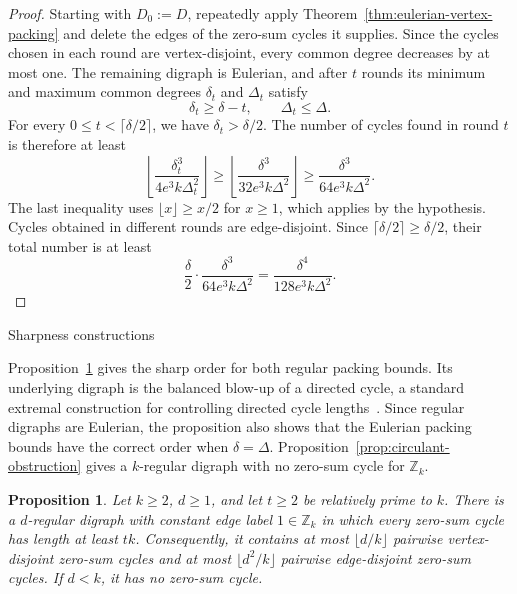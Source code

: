 \documentclass[11pt]{amsart}
\makeatletter
\def\section{\@startsection{section}{1}%
  \z@{1.5\linespacing\@plus.6\linespacing}{.65\linespacing}%
  {\normalfont\Large\bfseries\raggedright}}
\newtheorem{proposition}[theorem]{Proposition}
\theoremstyle{remark}
\makeatother
\begin{document}
\begin{proof}
Starting with $D_0:=D$, repeatedly apply
Theorem~\ref{thm:eulerian-vertex-packing} and delete the edges of the
zero-sum cycles it supplies.  Since the cycles chosen in each round are
vertex-disjoint, every common degree decreases by at most one.  The
remaining digraph is Eulerian, and after $t$ rounds its minimum and
maximum common degrees $\delta_t$ and $\Delta_t$ satisfy
\[
  \delta_t\ge\delta-t,
  \qquad
  \Delta_t\le\Delta.
\]
For every $0\le t<\lceil\delta/2\rceil$, we have
$\delta_t>\delta/2$.  The number of cycles found in round $t$ is
therefore at least
\[
  \left\lfloor
  \frac{\delta_t^3}{4e^3k\Delta_t^2}
  \right\rfloor
  \ge
  \left\lfloor
  \frac{\delta^3}{32e^3k\Delta^2}
  \right\rfloor
  \ge
  \frac{\delta^3}{64e^3k\Delta^2}.
\]
The last inequality uses $\lfloor x\rfloor\ge x/2$ for $x\ge1$,
which applies by the hypothesis.  Cycles obtained in different rounds
are edge-disjoint.  Since $\lceil\delta/2\rceil\ge\delta/2$, their
total number is at least
\[
  \frac\delta2\cdot
  \frac{\delta^3}{64e^3k\Delta^2}
  =\frac{\delta^4}{128e^3k\Delta^2}.
\]
\end{proof}

\section{Sharpness constructions}

Proposition~\ref{prop:obstruction} gives the sharp order for both
regular packing bounds.  Its underlying digraph is the
balanced blow-up of a directed cycle, a standard extremal construction
for controlling directed cycle lengths~\cite[p.~252]{KellyKuhnOsthus}.
Since regular digraphs are Eulerian, the proposition also shows that
the Eulerian packing bounds have the correct order when
$\delta=\Delta$.  Proposition~\ref{prop:circulant-obstruction} gives a
$k$-regular digraph with no zero-sum cycle for $\mathbb Z_k$.

\begin{proposition}\label{prop:obstruction}
Let $k\ge2$, $d\ge1$, and let $t\ge2$ be relatively prime to $k$.
There is a $d$-regular digraph with constant edge label
$1\in\mathbb Z_k$ in which every zero-sum cycle has length at least
$tk$.  Consequently, it contains at most $\lfloor d/k\rfloor$ pairwise
vertex-disjoint zero-sum cycles and at most $\lfloor d^2/k\rfloor$
pairwise edge-disjoint zero-sum cycles.  If $d<k$, it has no zero-sum
cycle.
\end{proposition}
\end{document}
